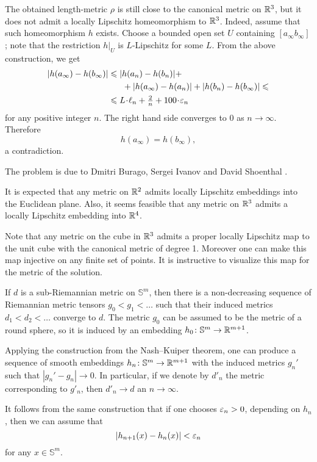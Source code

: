 The obtained length-metric $\rho$ is still close to the canonical metric on $\mathbb{R}^3$,
but it does not admit 
a locally Lipschitz homeomorphism to $\mathbb{R}^3$.
Indeed, 
assume that such homeomorphism $h$ exists.
Choose a bounded open set $U$ containing $[a_\infty b_\infty]$;
note that the restriction $h|_U$ is $L$-Lipschitz for some $L$.
From the above construction,
we get 
\begin{align*}
|h(a_\infty)-h(b_\infty)|
&\le 
|h(a_n)-h(b_n)|
+
\\
&\ \ \ \ \ +
|h(a_\infty)-h(a_n)|
+
|h(b_n)-h(b_\infty)|
\le
\\
&\le
L\cdot\ell_n+\tfrac2n+100\cdot\eps_n
\end{align*}
for any positive integer $n$.
The right hand side converges to $0$ as $n\to\infty$.
Therefore 
\[h(a_\infty)=h(b_\infty),\] 
a contradiction.\qeds



The problem is due to
Dmitri Burago, 
Sergei Ivanov 
and David Shoenthal \cite{BIS}.

It is expected that any metric on $\mathbb{R}^2$ admits locally Lipschitz embeddings into the Euclidean plane.
Also, it seems feasible that any metric on $\mathbb{R}^3$ admits a locally Lipschitz embedding into $\mathbb{R}^4$.

Note that any metric on the cube in $\mathbb{R}^3$ admits a proper locally Lipschitz map to the unit cube with the canonical metric of degree 1.
Moreover one can make this map injective on any finite set of points.
It is instructive to visualize this map for the metric of the solution.

If $d$ is a sub-Riemannian metric on $\mathbb{S}^m$,
then there is a non-decreasing sequence of Riemannian metric tensors
$g_0< g_1<\dots$ such that their induced metrics $d_1<d_2<\dots$ converge to $d$.
The metric $g_0$ can be assumed to be the metric of a round sphere,
so it is induced by an embedding $h_0\colon\mathbb{S}^m\to \mathbb{R}^{m+1}$.

Applying the construction from the Nash--Kuiper theorem,
one can produce a sequence of smooth embeddings $h_n\colon\mathbb{S}^m\to \mathbb{R}^{m+1}$ with the induced metrics $g_n'$
such that $|g_n'-g_n|\to 0$.
In particular, if we denote by $d'_n$ the metric corresponding to $g'_n$, then $d'_n\to d$ an $n\to\infty$.

It follows from the same construction that
if one chooses $\varepsilon_n>0$, depending on $h_n$,
then we can assume that 
\[|h_{n+1}(x)-h_n(x)|<\varepsilon_n\] for any $x\in \mathbb{S}^m$.

